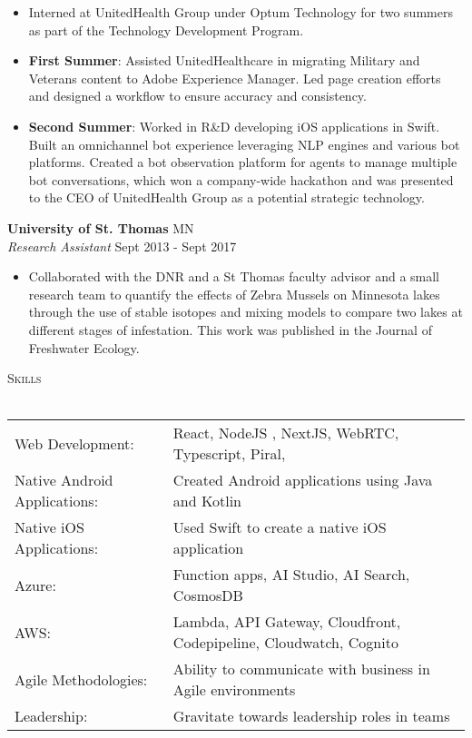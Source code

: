 \documentclass[a4paper]{article}
\newcommand{\lineunder} {
    \vspace*{-8pt} \\
    \hspace*{-18pt} \hrulefill \\
}
\newcommand{\header} [1] {
    {\hspace*{-18pt}\vspace*{6pt} \textsc{#1}}
    \vspace*{-6pt} \lineunder
}
\begin{document}
\vspace{-1mm}
\begin{itemize} \itemsep 1pt
    \item Interned at UnitedHealth Group under Optum Technology for two summers as part of the Technology Development Program.
    \item \textbf{First Summer}: Assisted UnitedHealthcare in migrating Military and Veterans content to Adobe Experience Manager. Led page creation efforts and designed a workflow to ensure accuracy and consistency.
    \item \textbf{Second Summer}: Worked in R\&D developing iOS applications in Swift. Built an omnichannel bot experience leveraging NLP engines and various bot platforms. Created a bot observation platform for agents to manage multiple bot conversations, which won a company-wide hackathon and was presented to the CEO of UnitedHealth Group as a potential strategic technology.
\end{itemize}

\textbf{University of St. Thomas} \hfill MN\\
\textit{Research Assistant} \hfill Sept 2013 - Sept 2017\\
\vspace{-1mm}
\begin{itemize} \itemsep 1pt
    \item Collaborated with the DNR and a St Thomas faculty advisor and a small research team to quantify the effects of Zebra Mussels on Minnesota lakes through the use of stable isotopes and mixing models to compare two lakes at different stages of infestation. This work was published in the Journal of Freshwater Ecology.
\end{itemize}

\header{Skills}
\begin{tabular}{ l l }
    Web Development:                    & React, NodeJS , NextJS, WebRTC, Typescript, Piral, 
\\
    Native Android Applications:        & Created Android applications using Java and Kotlin                                                                                                \\
    Native iOS Applications:            & Used Swift to create a native iOS application                                                                                                     \\
        Azure:                              & Function apps, AI Studio, AI Search, CosmosDB                                                          \\
    AWS:                                & Lambda, API Gateway, Cloudfront, Codepipeline, Cloudwatch, Cognito                                                          \\
    Agile Methodologies:                & Ability to communicate with business in Agile environments
\\
    Leadership:                         & Gravitate towards leadership roles in teams 
\\
\end{tabular}
\vspace{2mm}
\end{document}
